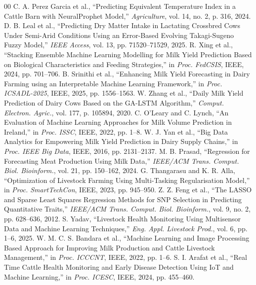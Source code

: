 \documentclass[conference]{IEEEtran}
\begin{document}
		
		\begin{thebibliography}{00}
			 C. A. Perez Garcia et al., ``Predicting Equivalent Temperature Index in a Cattle Barn with NeuralProphet Model,'' \textit{Agriculture}, vol. 14, no. 2, p. 316, 2024.
			 D. B. Leal et al., ``Predicting Dry Matter Intake in Lactating Crossbred Cows Under Semi-Arid Conditions Using an Error-Based Evolving Takagi-Sugeno Fuzzy Model,'' \textit{IEEE Access}, vol. 13, pp. 71520--71529, 2025.
			 R. Xing et al., ``Stacking Ensemble Machine Learning Modelling for Milk Yield Prediction Based on Biological Characteristics and Feeding Strategies,'' in \textit{Proc. FedCSIS}, IEEE, 2024, pp. 701--706.
			 B. Srinithi et al., ``Enhancing Milk Yield Forecasting in Dairy Farming using an Interpretable Machine Learning Framework,'' in \textit{Proc. ICSADL-2025}, IEEE, 2025, pp. 1556--1563.
			 W. Zhang et al., ``Daily Milk Yield Prediction of Dairy Cows Based on the GA-LSTM Algorithm,'' \textit{Comput. Electron. Agric.}, vol. 177, p. 105894, 2020.
			 C. O'Leary and C. Lynch, ``An Evaluation of Machine Learning Approaches for Milk Volume Prediction in Ireland,'' in \textit{Proc. ISSC}, IEEE, 2022, pp. 1--8.
			 W. J. Yan et al., ``Big Data Analytics for Empowering Milk Yield Prediction in Dairy Supply Chains,'' in \textit{Proc. IEEE Big Data}, IEEE, 2016, pp. 2131--2137.
			 M. B. Prasad, ``Regression for Forecasting Meat Production Using Milk Data,'' \textit{IEEE/ACM Trans. Comput. Biol. Bioinform.}, vol. 21, pp. 150--162, 2024.
			 G. Thangarasu and K. R. Alla, ``Optimization of Livestock Farming Using Multi-Tasking Regularisation Model,'' in \textit{Proc. SmartTechCon}, IEEE, 2023, pp. 945--950.
			 Z. Z. Feng et al., ``The LASSO and Sparse Least Squares Regression Methods for SNP Selection in Predicting Quantitative Traits,'' \textit{IEEE/ACM Trans. Comput. Biol. Bioinform.}, vol. 9, no. 2, pp. 628--636, 2012.
			 S. Yadav, ``Livestock Health Monitoring Using Multisensor Data and Machine Learning Techniques,'' \textit{Eng. Appl. Livestock Prod.}, vol. 6, pp. 1--6, 2025.
			 W. M. C. S. Bandara et al., ``Machine Learning and Image Processing Based Approach for Improving Milk Production and Cattle Livestock Management,'' in \textit{Proc. ICCCNT}, IEEE, 2022, pp. 1--6.
			 S. I. Arafat et al., ``Real Time Cattle Health Monitoring and Early Disease Detection Using IoT and Machine Learning,'' in \textit{Proc. ICESC}, IEEE, 2024, pp. 455--460.

\end{thebibliography}
\end{document}
